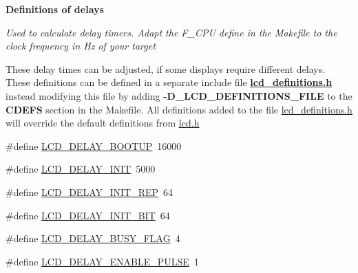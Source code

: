 \begin{Indent}{\bf Definitions of delays}\par
{\em Used to calculate delay timers. Adapt the F\+\_\+\+C\+PU define in the Makefile to the clock frequency in Hz of your target

These delay times can be adjusted, if some displays require different delays.~\newline
These definitions can be defined in a separate include file {\bfseries \hyperlink{a00003_source}{lcd\+\_\+definitions.\+h}} instead modifying this file by adding {\bfseries -\/\+D\+\_\+\+L\+C\+D\+\_\+\+D\+E\+F\+I\+N\+I\+T\+I\+O\+N\+S\+\_\+\+F\+I\+LE} to the {\bfseries C\+D\+E\+FS} section in the Makefile. All definitions added to the file \hyperlink{a00003_source}{lcd\+\_\+definitions.\+h} will override the default definitions from \hyperlink{a00002}{lcd.\+h} }\begin{DoxyCompactItemize}
\item 
\#define \hyperlink{a00006_ga79ca3fe83448ab158a4c566bf292c260}{L\+C\+D\+\_\+\+D\+E\+L\+A\+Y\+\_\+\+B\+O\+O\+T\+UP}~16000
\item 
\#define \hyperlink{a00006_gab6ba3c8cdcf1a96b0d4c476eff8f8617}{L\+C\+D\+\_\+\+D\+E\+L\+A\+Y\+\_\+\+I\+N\+IT}~5000
\item 
\#define \hyperlink{a00006_ga2ce1ac9b146b7baa7169e27f9cf3a99e}{L\+C\+D\+\_\+\+D\+E\+L\+A\+Y\+\_\+\+I\+N\+I\+T\+\_\+\+R\+EP}~64
\item 
\#define \hyperlink{a00006_gadf773dcbd0827cd15c788065c9197459}{L\+C\+D\+\_\+\+D\+E\+L\+A\+Y\+\_\+\+I\+N\+I\+T\+\_\+B\+IT}~64
\item 
\#define \hyperlink{a00006_ga73b2370827e2d350cedd45e08a9eb0b2}{L\+C\+D\+\_\+\+D\+E\+L\+A\+Y\+\_\+\+B\+U\+S\+Y\+\_\+\+F\+L\+AG}~4
\item 
\#define \hyperlink{a00006_ga5b0632f09757ffe6f018c6ef88cc3296}{L\+C\+D\+\_\+\+D\+E\+L\+A\+Y\+\_\+\+E\+N\+A\+B\+L\+E\+\_\+\+P\+U\+L\+SE}~1
\end{DoxyCompactItemize}
\end{Indent}
